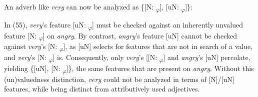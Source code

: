 \documentclass[output=paper
,modfonts
,nonflat]{langsci/langscibook}
\begin{document}
\begin{figure}[!h]
\begin{exe}
\end{exe}
\end{figure}

\noindent An adverb like \textit{very} can now be analyzed as \{[N: \ul{}\textsubscript{$\varphi$}], [uN: \ul{}\textsubscript{$\varphi$}]\}: 

\begin{figure}[!h]
\begin{exe}
\end{exe}
\end{figure}
\noindent In (55), \textit{very}’s feature [uN: \ul{}\textsubscript{$\varphi$}] must be checked against an inherently unvalued feature [N: \ul{}\textsubscript{$\varphi$}] on \textit{angry}. By contrast, \textit{angry}’s feature [uN] cannot be checked against \textit{very}’s [N: \ul{}\textsubscript{$\varphi$}], as [uN] selects for features that are not in search of a value, and \textit{very}’s [N: \ul{}\textsubscript{$\varphi$}] is. Consequently, only \textit{very}’s [[N: \ul{}\textsubscript{$\varphi$}] and \textit{angry}’s [uN] percolate, yielding \{[uN], [N: \ul{}\textsubscript{$\varphi$}]\}, the same features that are present on \textit{angry}. Without this (un)valuedness distinction, \textit{very} could not be analyzed in terms of [N]/[uN] features, while being distinct from attributively used adjectives.
\end{document}
